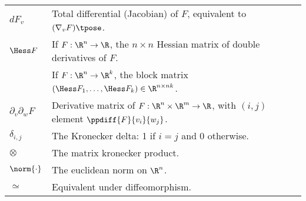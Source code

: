 \begin{table}[h!]
{\begin{tabular}{ll}
   \(dF_v\) & Total differential (Jacobian) of \(F\), equivalent to \((\nabla_v F)\tpose\). \\
   \(\Hess F\) & If \(F : \R^n \rightarrow \R\), the \(n \times n\) Hessian matrix of double derivatives of \(F\). \\
               & If \(F : \R^n \rightarrow \R^k\), the block matrix \((\Hess F_1, \ldots, \Hess F_k) \in \R^{n \times nk}\). \\
   \(\partial_v \partial_w F\) & Derivative matrix of \(F : \R^n \times \R^m \rightarrow \R\), with \((i,j)\) element \(\ppdiff{F}{v_i}{w_j}\). \\
   \(\delta_{i,j}\) & The Kronecker delta: 1 if \(i = j\) and 0 otherwise. \\
   \(\otimes\) & The matrix kronecker product. \\ 
   \(\norm{\cdot}\) & The euclidean norm on \(\R^n\). \\
   \(\simeq\) & Equivalent under diffeomorphism. \\
   \bottomrule
\end{tabular}

}%
\end{table}

%
%
